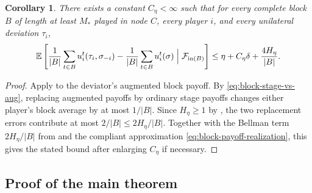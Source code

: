 \documentclass[12pt]{article}
\newtheorem{corollary}[theorem]{Corollary}
\theoremstyle{definition}
\newcommand{\E}{\mathbb{E}}
\newcommand{\1}{\mathbf{1}}
\newcommand{\cF}{\mathcal{F}}
\begin{document}
\begin{corollary}
\label{cor:block-regret}
There exists a constant $C_\eta<\infty$ such that for every complete block $B$ of
length at least $M_*$ played in node $C$, every player $i$, and every unilateral
deviation $\tau_i$,
\[
\E\left[
\frac1{|B|}\sum_{t\in B}u_i^t(\tau_i,\sigma_{-i})
-
\frac1{|B|}\sum_{t\in B}u_i^t(\sigma)
\Bigm|\cF_{\mathrm{in}(B)}
\right]
\le
\eta + C_\eta\delta + \frac{4H_\eta}{|B|}.
\]
\end{corollary}

\begin{proof}
Apply  to the deviator's augmented block payoff. By
\eqref{eq:block-stage-vs-aug}, replacing augmented payoffs by ordinary stage
payoffs changes either player's block average by at most $1/|B|$. Since
$H_\eta\ge 1$ by , the two replacement errors contribute at
most $2/|B|\le 2H_\eta/|B|$. Together with the Bellman term $2H_\eta/|B|$ from
 and the compliant approximation
\eqref{eq:block-payoff-realization}, this gives the stated bound after enlarging
$C_\eta$ if necessary.
\end{proof}

\subsection{Proof of the main theorem}
\end{document}
